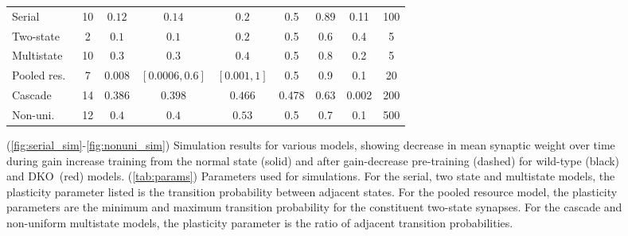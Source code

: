 \documentclass[10pt]{article}
\renewenvironment{myenumA}{\begin{inparaenum}[\bfseries A]}{\end{inparaenum}}
\newcommand{\KO}{DKO}
\begin{document}
\begin{figure}[p]
\begin{preview}
\begin{myenumA}
{\begin{tabular}{|l|c|c|c|c|c|c|c|c|}
    \cline{1-9}
    Serial   & 10 & $0.12$  & $0.14$  & $0.2$  & 0.5 & 0.89 & 0.11  & 100  \\%
    Two-state     & 2  & $0.1$  & $0.1$  & $0.2$  & 0.5 & 0.6 & 0.4  & 5   \\%
    Multistate    & 10 & $0.3$  & $0.3$  & $0.4$  & 0.5 & 0.8 & 0.2  & 5   \\%
    Pooled res.\ & 7  & $0.008$        & $[0.0006,0.6]$  & $[0.001,1]$
                                          & 0.5 & 0.9 & 0.1 & 20 \\%
    Cascade  & 14 & $0.386$  & $0.398$  & $0.466$  & 0.478 & 0.63 & 0.002  & 200  \\%
    Non-uni.\ & 12 & $0.4$    & $0.4$    & $0.53$   & 0.5 & 0.7 & 0.1 & 500  \\%
    \cline{1-9}
  \end{tabular}}
  \end{myenumA}
\end{preview}
  \caption[Simulation results for various models]{(\ref{fig:serial_sim}-\ref{fig:nonuni_sim}) Simulation results for various models, showing decrease in mean synaptic weight over time during gain increase training from the normal state (solid) and after gain-decrease pre-training (dashed) for wild-type (black) and \KO\ (red) models.
  (\ref{tab:params}) Parameters used for simulations.
  For the serial, two state and multistate models, the plasticity parameter listed is the transition probability between adjacent states.
  For the pooled resource model, the plasticity parameters are the minimum and maximum transition probability for the constituent two-state synapses.
  For the cascade and non-uniform multistate models, the plasticity parameter is the ratio of adjacent transition probabilities.}\label{fig:sim_results}
\end{figure}
\end{document}

